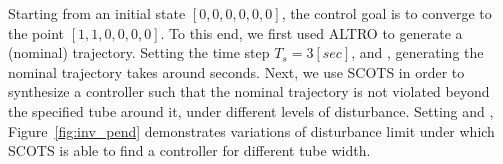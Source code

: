 Starting from an initial state $[0,0,0,0,0,0]$, the control goal is to converge to the point 
$[1,1,0,0,0,0]$. To this end, we first used ALTRO to generate a (nominal) trajectory. Setting the time step $T_s=3[sec]$, and , generating the nominal trajectory takes around  seconds. Next, we use SCOTS in order to synthesize a controller such that the nominal trajectory is not violated beyond the specified tube around it, under different levels of disturbance. Setting  and , Figure~\ref{fig:inv_pend} demonstrates variations of disturbance limit under which SCOTS is able to find a controller for different tube width. %





